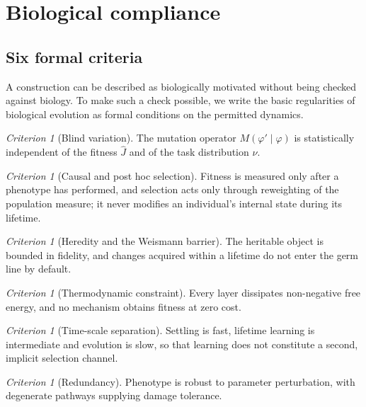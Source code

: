\documentclass[11pt]{article}
\theoremstyle{definition}
\theoremstyle{remark}
\newtheorem{criterion}[theorem]{Criterion}
\begin{document}
\section{Biological compliance}
\label{sec:bio}

\subsection{Six formal criteria}
A construction can be described as biologically motivated without being checked against biology. To
make such a check possible, we write the basic regularities of biological evolution as formal
conditions on the permitted dynamics.
\begin{criterion}[Blind variation]
The mutation operator $M(\varphi'\mid\varphi)$ is statistically independent of the fitness $\hat J$ and
of the task distribution $\nu$.
\end{criterion}
\begin{criterion}[Causal and post hoc selection]
Fitness is measured only after a phenotype has performed, and selection acts only through reweighting
of the population measure; it never modifies an individual's internal state during its lifetime.
\end{criterion}
\begin{criterion}[Heredity and the Weismann barrier]
The heritable object is bounded in fidelity, and changes acquired within a lifetime do not enter the
germ line by default.
\end{criterion}
\begin{criterion}[Thermodynamic constraint]
Every layer dissipates non-negative free energy, and no mechanism obtains fitness at zero cost.
\end{criterion}
\begin{criterion}[Time-scale separation]
Settling is fast, lifetime learning is intermediate and evolution is slow, so that learning does not
constitute a second, implicit selection channel.
\end{criterion}
\begin{criterion}[Redundancy]
Phenotype is robust to parameter perturbation, with degenerate pathways supplying damage tolerance.
\end{criterion}
\end{document}
